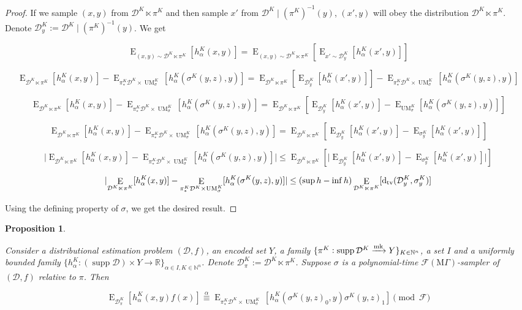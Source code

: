 \documentclass{article}
\numberwithin{equation}{section}
\theoremstyle{definition}
\theoremstyle{plain}
\newtheorem{proposition}{Proposition}[section]
\DeclareMathOperator{\Supp}{supp}
\DeclareMathOperator{\E}{E}
\DeclareMathOperator{\UM}{UM}
\newcommand{\Dtv}{\operatorname{d}_{\textnormal{tv}}}
\newcommand{\Nats}{\mathbb{N}}
\newcommand{\Reals}{\mathbb{R}}
\newcommand{\Abs}[1]{\lvert #1 \rvert}
\newcommand{\Dist}{\mathcal{D}}
\newcommand{\MGrow}{\mathrm{M}\Gamma}
\newcommand{\Fall}{\mathcal{F}}
\newcommand{\EMG}{\Fall(\MGrow)}
\newcommand{\Markov}{\xrightarrow{\textnormal{mk}}}
\begin{document}
\begin{proof}

If we sample $(x,y)$ from $\Dist^{K} \ltimes \pi^K$ and then sample $x'$ from ${\Dist^{K} \mid (\pi^K)^{-1}(y)}$, $(x',y)$ will obey the distribution $\Dist^{K} \ltimes \pi^K$. Denote $\Dist_y^K:=\Dist^{K} \mid (\pi^K)^{-1}(y)$. We get

$$\E_{(x,y) \sim \Dist^{K} \ltimes \pi^K}[h_\alpha^K(x,y)] = \E_{(x,y) \sim \Dist^{K} \ltimes \pi^K}[\E_{x' \sim \Dist_y^K}[h_\alpha^K(x',y)]]$$

$$\E_{\Dist^{K} \ltimes \pi^K}[h_\alpha^K(x,y)] - \E_{\pi_*^K\Dist^{K} \times \UM_\sigma^K}[h_\alpha^K(\sigma^K(y,z),y)] = \E_{\Dist^{K} \ltimes \pi^K}[\E_{\Dist_y^K}[h_\alpha^K(x',y)]] - \E_{\pi_*^K\Dist^{K} \times \UM_\sigma^K}[h_\alpha^K(\sigma^K(y,z),y)]$$

$$\E_{\Dist^{K} \ltimes \pi^K}[h_\alpha^K(x,y)] - \E_{\pi_*^K\Dist^{K} \times \UM_\sigma^K}[h_\alpha^K(\sigma^K(y,z),y)] = \E_{\Dist^{K} \ltimes \pi^K}[\E_{\Dist_y^K}[h_\alpha^K(x',y)]-\E_{\UM_\sigma^K}[h_\alpha^K(\sigma^K(y,z),y)]]$$

$$\E_{\Dist^{K} \ltimes \pi^K}[h_\alpha^K(x,y)] - \E_{\pi_*^K\Dist^{K} \times \UM_\sigma^K}[h_\alpha^K(\sigma^K(y,z),y)] = \E_{\Dist^{K} \ltimes \pi^K}[\E_{\Dist_y^K}[h_\alpha^K(x',y)]-\E_{\sigma_y^K}[h_\alpha^K(x',y)]]$$

$$\Abs{\E_{\Dist^{K} \ltimes \pi^K}[h_\alpha^K(x,y)] - \E_{\pi_*^K\Dist^{K} \times \UM_\sigma^K}[h_\alpha^K(\sigma^K(y,z),y)]} \leq \E_{\Dist^{K} \ltimes \pi^K}[\Abs{\E_{\Dist_y^K}[h_\alpha^K(x',y)]-\E_{\sigma_y^K}[h_\alpha^K(x',y)]}]$$

$$\Abs{\E_{\Dist^{K} \ltimes \pi^K}[h_\alpha^K(x,y)] - \E_{\pi_*^K\Dist^{K} \times \UM_\sigma^K}[h_\alpha^K(\sigma^K(y,z),y)]} \leq (\sup h - \inf h) \E_{\Dist^{K} \ltimes \pi^K}[\Dtv(\Dist_y^K,\sigma_y^K)]$$

Using the defining property of $\sigma$, we get the desired result.
\end{proof}

\begin{proposition}
\label{prp:gen}

Consider a distributional estimation problem $(\Dist,f)$, an encoded set $Y$, a family ${\{\pi^K: \Supp \Dist^{K} \Markov Y\}_{K \in \Nats^n}}$, a set ${I}$ and a uniformly bounded family ${\{h_\alpha^K: (\Supp \Dist) \times Y \rightarrow \Reals\}_{\alpha \in I, K \in \Nats^n}}$. Denote $\Dist_\pi^K:=\Dist^{K} \ltimes \pi^K$. Suppose $\sigma$ is a polynomial-time $\EMG$-sampler of $(\Dist,f)$ relative to $\pi$. Then

\begin{equation}
\E_{\Dist_\pi^K}[h_\alpha^K(x,y)f(x)] \overset{\alpha}{\equiv} \E_{\pi_*^K\Dist^{K} \times \UM_\sigma^K}[h_\alpha^K(\sigma^K(y,z)_0,y)\sigma^K(y,z)_1] \pmod \Fall
\end{equation}

\end{proposition}
\end{document}
